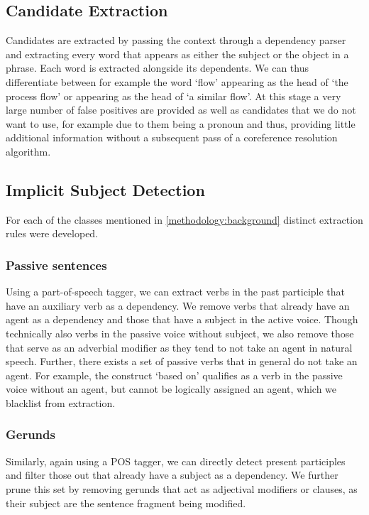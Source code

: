 \documentclass[times, 10pt,twocolumn]{article}
\begin{document}
\subsection{Candidate Extraction}
Candidates are extracted by passing the context through a dependency parser and extracting every word that
appears as either the subject or the object in a phrase. Each word is extracted alongside its dependents.
We can thus differentiate between for example the word `flow' appearing as the head of `the process flow'
or appearing as the head of `a similar flow'. At this stage a very large number of false positives
are provided as well as candidates that we do not want to use, for example due to them being a pronoun
and thus, providing little additional information without a subsequent pass of a coreference resolution
algorithm.


\subsection{Implicit Subject Detection}
For each of the classes mentioned in \ref{methodology:background} distinct extraction rules were developed.

\subsubsection{Passive sentences}
Using a part-of-speech tagger, we can extract verbs in the past participle that have an
auxiliary verb as a dependency. We remove verbs that
already have an agent as a dependency and those that have a subject in the active voice.
Though technically also verbs in the passive voice without subject, we also remove those that
serve as an adverbial modifier as they tend to not take an agent in natural speech.
Further, there exists a set of passive verbs that in general do not take an agent.
For example, the construct `based on' qualifies as a verb in the passive voice without an agent,
but cannot be logically assigned an agent, which we blacklist from extraction.  

\subsubsection{Gerunds}
Similarly, again using a POS tagger, we can directly detect present participles and filter those
out that already have a subject as a dependency. We further prune this set by removing gerunds that
act as adjectival modifiers or clauses, as their subject are the sentence fragment being modified. 
\end{document}
